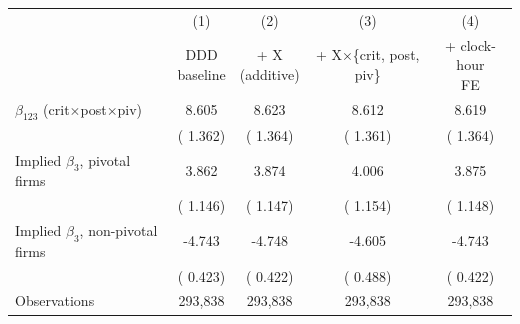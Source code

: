 \begin{tabular}{l c c c c}
\toprule
 & (1) & (2) & (3) & (4) \\
 & \makecell{DDD\\baseline} & \makecell{+ X\\(additive)} & \makecell{+ X{$\times$}\{crit,\\post, piv\}} & \makecell{+ clock-hour\\FE} \\
\midrule
$\beta_{123}$ (crit{$\times$}post{$\times$}piv) &     8.605 &     8.623 &     8.612 &     8.619 \\
  & (    1.362) & (    1.364) & (    1.361) & (    1.364) \\
\addlinespace
Implied $\beta_3$, pivotal firms &     3.862 &     3.874 &     4.006 &     3.875 \\
  & (    1.146) & (    1.147) & (    1.154) & (    1.148) \\
\addlinespace
Implied $\beta_3$, non-pivotal firms &    -4.743 &    -4.748 &    -4.605 &    -4.743 \\
  & (    0.423) & (    0.422) & (    0.488) & (    0.422) \\
\midrule
Observations &   293,838 &   293,838 &   293,838 &   293,838 \\
\bottomrule
\end{tabular}
